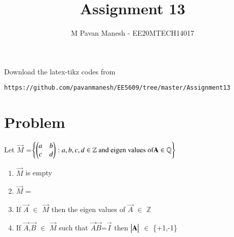 \documentclass[journal,12pt]{IEEEtran}
\begin{document}
     \def\rightbox#1{\makebox[0in][r]{#1}}
     \def\centbox#1{\makebox[0in]{#1}}
     \def\topbox#1{\raisebox{-\baselineskip}[0in][0in]{#1}}
     \def\midbox#1{\raisebox{-0.5\baselineskip}[0in][0in]{#1}}
\vspace{3cm}
\title{Assignment 13}
\author{M Pavan Manesh - EE20MTECH14017}
\maketitle
\bigskip
\renewcommand{\thefigure}{\theenumi}
\renewcommand{\thetable}{\theenumi}
%
Download the latex-tikz codes from 
%
\begin{lstlisting}
https://github.com/pavanmanesh/EE5609/tree/master/Assignment13
\end{lstlisting}
\section{\textbf{Problem}}
Let $\vec{M}$ =$\left\{\begin{pmatrix}a&b\\c&d\end{pmatrix} : a,b,c,d \in \mathbb{Z} \text{ and eigen values of} \mathbf{A} \in \mathbb{Q}\right\}$ \label{main}
\begin{enumerate}
    \item $\vec{M}$ is empty
    \item $\vec{M}$ =
    \item If $\vec{A}$ $\in$ $\vec{M}$ then the eigen values of $\vec{A}$ $\in$ $\mathbb{Z}$
    \item If $\vec{A}$,$\vec{B}$ $\in$ $\vec{M}$ such that $\vec{A} \vec{B}$=$\vec{I}$ then $\begin{vmatrix}\mathbf{A}\end{vmatrix}$ $\in$ \{+1,-1\}
\end{enumerate}
\end{document}
